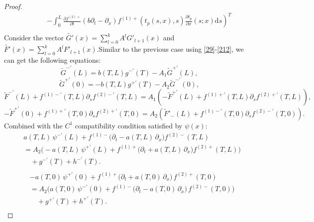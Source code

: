 \documentclass[a4paper,reqno,11pt]{amsart}
\numberwithin{equation}{section} %
\begin{document}
\begin{proof}
$$\begin{aligned}
& \quad  \quad\left.-\int_0^L{\frac{\partial f^{\left( 2 \right) +}}{\partial t}\left( b\partial _t-\partial _x \right) f^{\left( 1 \right) +}\left( t_p\left( s,x \right) ,s \right) \frac{\partial t_p}{\partial x}\left( s;x \right) \mathrm{d}s} \right) ^T\\
\end{aligned}
$$
Consider the vector $\tilde{G'}  (x) = \sum_{l=0}^k A^l G '_{l+1}(x)$ and  $\tilde{F'}  (x) = \sum_{l=0}^k A^l F '_{l+1}(x)$.Similar to the previous case using \eqref{29}-\eqref{212}, we can get the following equations:
$$
\tilde{G}^{-\prime}\left( L \right) =b\left( T,L \right) g^{-\prime}\left( T \right) -A_1\tilde{G}^{+\prime}\left( L \right) ,
$$
$$
\tilde{G}^{+\prime}\left( 0 \right) =-b\left( T,L \right) g^{+\prime}\left( T \right) -A_2\tilde{G}^{-\prime}\left( 0 \right) ,
$$
$$
\tilde{F}^{-\prime}\left( L \right) +f^{\left( 1 \right) -\prime}\left( T,L \right) \partial _sf^{\left( 2 \right) -\prime}\left( T,L \right) =A_1\left( -\tilde{F}^{+\prime}\left( L \right) +f^{\left( 1 \right) +\prime}\left( T,L \right) \partial _sf^{\left( 2 \right) +\prime}\left( T,L \right) \right) ,
$$
$$
-\tilde{F}^{+\prime}\left( 0 \right) +f^{\left( 1 \right) +\prime}\left( T,0 \right) \partial _sf^{\left( 2 \right) +\prime}\left( T,0 \right) =A_2\left( \tilde{F}\prime _-\left( L \right) +f^{\left( 1 \right) -\prime}\left( T,0 \right) \partial _sf^{\left( 2 \right) -\prime}\left( T,0 \right) \right) .
$$
Combined with the $C^1$ compatibility condition satisfied by $\psi (x)$:
$$
\begin{aligned}
	&a(T,L)\,\psi ^{-\prime}(L)+f^{\left( 1 \right) -}\bigl( \partial _t-a(T,L)\,\partial _x \bigr) f^{\left( 2 \right) -}(T,L)\\
	&=A_2\bigl( -a(T,L)\,\psi ^{+\prime}(L)+f^{\left( 1 \right) +}\bigl( \partial _t+a(T,L)\,\partial _x \bigr) f^{\left( 2 \right) +}(T,L) \bigr)\\
	&\quad +g^{-\prime}(T)+h^{-\prime}(T).\\
\end{aligned}
$$
$$
\begin{aligned}
	&-a(T,0)\,\psi ^{+\prime}(0)+f^{\left( 1 \right) +}\bigl( \partial _t+a(T,0)\,\partial _x \bigr) \,f^{\left( 2 \right) +}(T,0)\\
	&=A_2\bigl( a(T,0)\,\psi ^{-\prime}(0)+f^{\left( 1 \right) -}\bigl( \partial _t-a(T,0)\,\partial _x \bigr) \,f^{\left( 2 \right) -}(T,0) \bigr)\\
	&\quad +g^{+\prime}(T)+h^{+\prime}(T).\\
\end{aligned}
$$



\end{proof}
\end{document}
